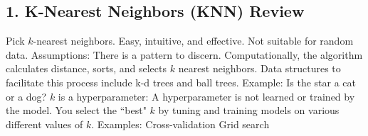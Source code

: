 
\begin{center}
\end{center}

\subsection*{1. K-Nearest Neighbors\cite{guo2003knn} (KNN) Review}
\begin{outline}
    \1 Pick $k$-nearest neighbors.
    \1 Easy, intuitive, and effective.
    \1 Not suitable for random data.
    \1 Assumptions:
        \2 There is a pattern to discern.
        \2 Computationally, the algorithm calculates distance, sorts, and selects $k$ nearest neighbors.
        \2 Data structures to facilitate this process include k-d trees and ball trees.
        \2 Example: Is the star a cat or a dog?
    \1 $k$ is a hyperparameter:
        \2 A hyperparameter is not learned or trained by the model.
        \2 You select the ``best" $k$ by tuning and training models on various different values of $k$.
        \2 Examples:
            \3 Cross-validation
            \3 Grid search
\end{outline}

